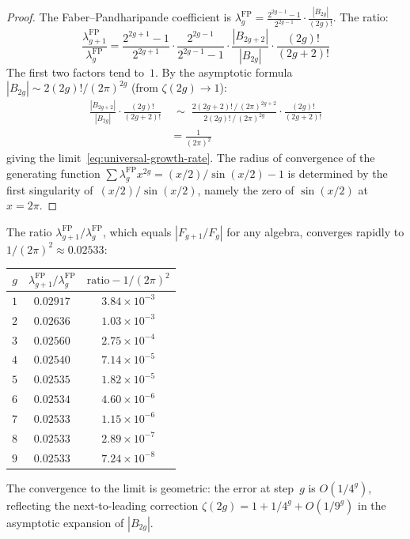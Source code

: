 \begin{proof}
The Faber--Pandharipande coefficient is
$\lambda_g^{\mathrm{FP}} = \frac{2^{2g-1}-1}{2^{2g-1}}
\cdot \frac{|B_{2g}|}{(2g)!}$.  The ratio:
\[
\frac{\lambda_{g+1}^{\mathrm{FP}}}
{\lambda_g^{\mathrm{FP}}}
= \frac{2^{2g+1}-1}{2^{2g+1}} \cdot
\frac{2^{2g-1}}{2^{2g-1}-1} \cdot
\frac{|B_{2g+2}|}{|B_{2g}|} \cdot
\frac{(2g)!}{(2g+2)!}
\]
The first two factors tend to~$1$.  By the asymptotic
formula $|B_{2g}| \sim 2(2g)!/(2\pi)^{2g}$
(from $\zeta(2g) \to 1$):
\begin{align*}
\frac{|B_{2g+2}|}{|B_{2g}|} \cdot
\frac{(2g)!}{(2g+2)!}
&\;\sim\;
\frac{2(2g{+}2)!\,/\,(2\pi)^{2g+2}}{2(2g)!\,/\,(2\pi)^{2g}}
\cdot \frac{(2g)!}{(2g{+}2)!}\\[3pt]
&= \frac{1}{(2\pi)^2}
\end{align*}
giving the limit~\eqref{eq:universal-growth-rate}.
The radius of convergence of the generating function
$\sum \lambda_g^{\mathrm{FP}} x^{2g} = (x/2)/\sin(x/2) - 1$
is determined by the first singularity
of~$(x/2)/\sin(x/2)$, namely the zero of
$\sin(x/2)$ at~$x = 2\pi$.
\end{proof}

\begin{computation}\label{comp:growth-ratios}
The ratio $\lambda_{g+1}^{\mathrm{FP}} /
\lambda_g^{\mathrm{FP}}$, which equals
$|F_{g+1}/F_g|$ for any algebra, converges rapidly to
$1/(2\pi)^2 \approx 0.02533$:

\medskip
\begin{center}
\renewcommand{\arraystretch}{1.3}
\begin{tabular}{ccc}
\toprule
$g$ & $\lambda_{g+1}^{\mathrm{FP}} /
\lambda_g^{\mathrm{FP}}$ & $\text{ratio} - 1/(2\pi)^2$ \\
\midrule
$1$ & $0.02917$ & $3.84 \times 10^{-3}$ \\
$2$ & $0.02636$ & $1.03 \times 10^{-3}$ \\
$3$ & $0.02560$ & $2.75 \times 10^{-4}$ \\
$4$ & $0.02540$ & $7.14 \times 10^{-5}$ \\
$5$ & $0.02535$ & $1.82 \times 10^{-5}$ \\
$6$ & $0.02534$ & $4.60 \times 10^{-6}$ \\
$7$ & $0.02533$ & $1.15 \times 10^{-6}$ \\
$8$ & $0.02533$ & $2.89 \times 10^{-7}$ \\
$9$ & $0.02533$ & $7.24 \times 10^{-8}$ \\
\bottomrule
\end{tabular}
\end{center}

\medskip
\noindent
The convergence to the limit is geometric: the error
at step~$g$ is $O(1/4^g)$, reflecting the next-to-leading
correction $\zeta(2g) = 1 + 1/4^g + O(1/9^g)$ in the
asymptotic expansion of $|B_{2g}|$.
\end{computation}

